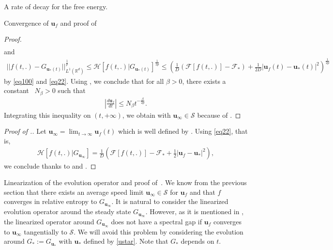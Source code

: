 \documentclass[reqno]{amsart} %
\begin{document}
\begin{section}{A rate of decay for the free energy.}
\begin{section}{Convergence of \texorpdfstring{$\mathbf{u}_{f}$}{uf} and proof of~\texorpdfstring{}{thm2}}
\begin{proof}
\begin{align*}
\end{align*}
and 
\begin{align*}
    ||f(t,.)-G_{\mathbf{u}_{*}(t)} ||_{L^1(\mathbb{R}^d)}^{\frac{1}{p}} \leq \mathcal{H}[f(t,.)|G_{\mathbf{u}_{*}(t)}]^{\frac{1}{2p}} \leq \left( \frac{1}{D}(\mathcal{F}[f(t,.)]- \mathcal{F}_*)+ \frac{1}{2D} |\mathbf{u}_{f}(t)-\mathbf{u}_{*}(t)|^2\right)^{\frac{1}{2p}}
\end{align*}
by \eqref{eq100} and \eqref{eq22}.
Using , we conclude that for all $\beta>0$, there exists a constant ~$N_{\beta}>0$ such that
\begin{align}
\label{deriv0}
    \left|  \frac{d\mathbf{u}_{f}}{dt}\right|\leq N_{\beta}t^{-\frac{\beta}{2p}}.
\end{align}
Integrating this inequality on $(t,+\infty)$, we obtain  with $\mathbf{u}_{\infty} \in \mathcal{S}$ because of .
\end{proof}

\begin{proof}[Proof of .]
Let $\mathbf{u}_{\infty}=\lim_{t\rightarrow \infty}\mathbf{u}_{f}(t)$ which is well defined by . Using \eqref{eq22}, that is, 
\begin{align*}
    \mathcal{H}[f(t,.)|G_{\mathbf{u}_{\infty}}]=\frac{1}{D}\left(\mathcal{F}[f(t,.)]-\mathcal{F}_*+\frac{1}{2}|\mathbf{u}_{f}-\mathbf{u}_*|^2 \right),
\end{align*}
we conclude thanks to  and .
\end{proof}

\end{section}



\begin{section}{Linearization of the evolution operator and proof of~\texorpdfstring{}{thm3}.}
\label{sec:: section 5}
We know from the previous section that there exists an average speed limit $\mathbf{u}_{\infty} \in \mathcal{S}$ for $\mathbf{u}_{f}$ and that $f$ converges in relative entropy to $G_{\mathbf{u}_{\infty}}$. It is natural to consider the linearized evolution operator around the steady state $G_{\mathbf{u}_{\infty}}$. However, as it is mentioned in \cite{Li2021}, the linearized operator around $G_{\mathbf{u}_{\infty}}$ does not have a spectral gap if $\mathbf{u}_{f}$ converges to $\mathbf{u}_{\infty}$ tangentially to $\mathcal{S}$. We will avoid this problem by considering the evolution around $G_*:=G_{\mathbf{u}_*}$ with $\mathbf{u}_*$ defined by \eqref{ustar}. Note that $G_*$ depends on $t$.


\end{section}
\end{section}
\end{document}
